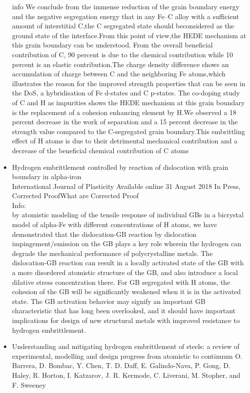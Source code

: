 \documentclass[11pt,floatfix,showpacs]{amsart}
\begin{document}
\begin{itemize}
info 
We conclude from the immense reduction of the grain boundary energy and the negative segregation energy that in any Fe–C alloy with a sufficient amount of
interstitial C,the C segregated state should beconsidered as the ground state of the interface.From this point of view,the HEDE mechanism at this grain boundary can be understood. From the overall beneficial contribution of C, 90 percent is due to the chemical contribution while 10 percent is an elastic contribution.The charge density difference shows an accumulation of charge between C and the neighboring Fe atoms,which illustrates the reason for the improved strength properties that can be seen in the DoS, a hybridisation of Fe d-states and C p-states.
The co-doping study of C and H as impurities shows the HEDE mechanism at this grain boundary is the replacement of a cohesion
enhancing element by H.We observed a 18 percent  decrease in the work of separation and a 15 percent decrease in the strength value compared to the C-segregated grain boundary.This embrittling effect of H atoms is due to their detrimental mechanical contribution and a decrease of the beneficial chemical contribution of C atoms

\item
Hydrogen embrittlement controlled by reaction of dislocation with grain boundary in alpha-iron\\
International Journal of Plasticity
Available online 31 August 2018
In Press, Corrected ProofWhat are Corrected Proof\\
Info:\\
by atomistic modeling of the tensile response of individual GBs in a bicrystal model of alpha-Fe with different concentrations of H atoms, we have demonstrated that the dislocation-GB reaction by dislocation impingement/emission on the GB plays a key role wherein the hydrogen can degrade the mechanical performance of polycrystalline metals. The dislocation-GB reaction can result in a locally activated state of the GB with a more disordered atomistic structure of the GB, and also introduce a local dilative stress concentration there. For GB segregated with H atoms, the cohesion of the GB will be significantly weakened when it is in the activated state. The GB activation behavior may signify an important GB characteristic that has long been overlooked, and it should have important implications for design of new structural metals with improved resistance to hydrogen embrittlement.


\item Understanding and mitigating hydrogen embrittlement
of steels: a review of experimental, modelling
and design progress from atomistic to continuum
O. Barrera, D. Bombac, Y. Chen, T. D. Daff, E. Galindo-Nava, P. Gong, D. Haley,
R. Horton, I. Katzarov, J. R. Kermode, C. Liverani, M. Stopher, and F. Sweeney


\end{itemize}
\end{document}
